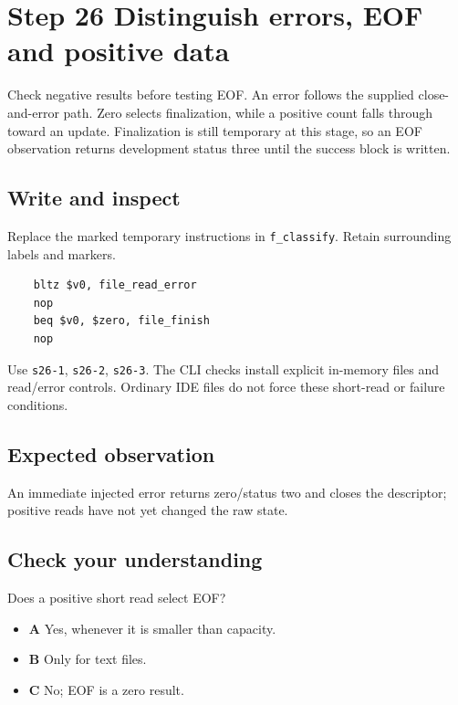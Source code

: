 \section{Step 26 Distinguish errors, EOF and positive data}\label{crc-s26}

Check negative results before testing EOF. An error follows the supplied close-and-error path. Zero selects finalization, while a positive count falls through toward an update. Finalization is still temporary at this stage, so an EOF observation returns development status three until the success block is written.

\subsection{Write and inspect}
Replace the marked temporary instructions in \texttt{f\_classify}. Retain surrounding labels and markers.

\begin{verbatim}
    bltz $v0, file_read_error
    nop
    beq $v0, $zero, file_finish
    nop
\end{verbatim}

Use \texttt{s26-1}, \texttt{s26-2}, \texttt{s26-3}. The CLI checks install explicit in-memory files and read/error controls. Ordinary IDE files do not force these short-read or failure conditions.

\subsection{Expected observation}
An immediate injected error returns zero/status two and closes the descriptor; positive reads have not yet changed the raw state.

\subsection{Check your understanding}
Does a positive short read select EOF?

\begin{itemize}
  \item \textbf{A} Yes, whenever it is smaller than capacity.
  \item \textbf{B} Only for text files.
  \item \textbf{C} No; EOF is a zero result.
\end{itemize}
